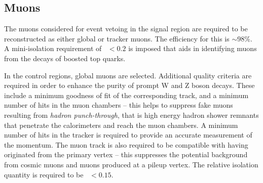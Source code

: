 \subsection*{Muons}

The muons considered for event vetoing in the signal region are required to be 
reconstructed as either global or tracker muons. The efficiency for this is 
$\sim98$\%. 
A mini-isolation requirement of 
\miniiso~$ < 0.2$ is imposed that aids in identifying muons from the decays of 
boosted top quarks.

In the control regions, global muons are selected. Additional quality criteria 
are required in order to enhance the purity of prompt W and Z boson decays. 
These include a minimum goodness of fit of the corresponding track, and a 
minimum number of hits in the muon chambers -- this helps to suppress fake 
muons resulting from \textit{hadron punch-through}, that is high energy hadron 
shower remnants that penetrate the calorimeters and reach the muon chambers. A 
minimum number of hits in the 
tracker is required to provide an accurate measurement of the momentum. The 
muon track is also required to be compatible with having originated from the 
primary vertex -- this suppresses the potential background from cosmic muons 
and muons produced at a pileup vertex. 
The relative isolation quantity is required to be \reliso~$ < 0.15$. 



